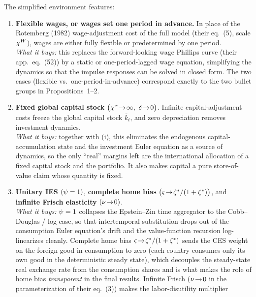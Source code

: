 \begin{definition}
\label{def:simplified}
The simplified environment features:
\begin{enumerate}[label=(\roman*),leftmargin=2.0em,itemsep=3pt]
  \item \textbf{Flexible wages, or wages set one period in advance.} In place of
  the Rotemberg (1982) wage-adjustment cost of the full model (their eq.~(5),
  scale $\chi^{W}$), wages are either fully flexible or predetermined by one
  period. \\[2pt]
  \emph{What it buys:} this replaces the forward-looking wage Phillips curve
  (their app.\ eq.~(52)) by a static or one-period-lagged wage equation,
  simplifying the dynamics so that the impulse responses can be solved in closed
  form. The two cases (flexible vs.\ one-period-in-advance) correspond exactly
  to the two bullet groups in Propositions~1--2.
  \item \textbf{Fixed global capital stock} $\bigl(\chi^{x}\!\to\!\infty,\
  \delta\!\to\!0\bigr)$. Infinite capital-adjustment costs freeze the global
  capital stock $\bar k_t$, and zero depreciation removes investment dynamics. \\[2pt]
  \emph{What it buys:} together with (i), this eliminates the endogenous
  capital-accumulation state and the investment Euler equation as a source of
  dynamics, so the only ``real'' margins left are the international allocation of
  a fixed capital stock and the portfolio. It also makes capital a pure
  store-of-value claim whose quantity is fixed.
  \item \textbf{Unitary IES} $(\psi=1)$, \textbf{complete home bias}
  $\bigl(\varsigma\!\to\!\zeta^{*}/(1+\zeta^{*})\bigr)$, and \textbf{infinite Frisch
  elasticity} $(\nu\!\to\!0)$. \\[2pt]
  \emph{What it buys:} $\psi=1$ collapses the Epstein--Zin time aggregator to the
  Cobb--Douglas / log case, so that intertemporal substitution drops out of the
  consumption Euler equation's drift and the value-function recursion
  log-linearizes cleanly. Complete home bias
  $\varsigma\!\to\!\zeta^{*}/(1+\zeta^{*})$ sends the CES weight on the foreign good in
  consumption to zero (each country consumes only its own good in the
  deterministic steady state), which decouples the steady-state real exchange
  rate from the consumption shares and is what makes the role of home bias
  \emph{transparent} in the final results. Infinite Frisch ($\nu\!\to\!0$ in
  the parameterization of their eq.~(3)) makes the labor-disutility multiplier

\end{enumerate}
\end{definition}
